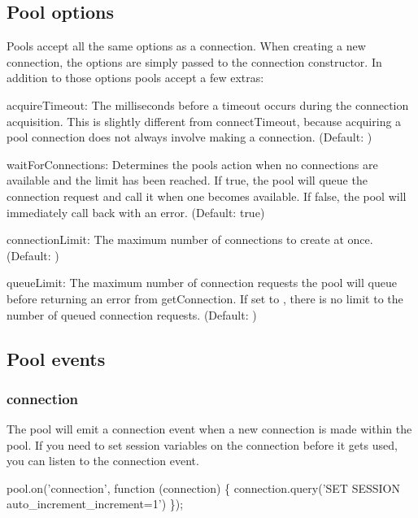\subsection*{Pool options}

Pools accept all the same options as a connection. When creating a new connection, the options are simply passed to the connection constructor. In addition to those options pools accept a few extras\+:


\begin{DoxyItemize}
\item {\ttfamily acquire\+Timeout}\+: The milliseconds before a timeout occurs during the connection acquisition. This is slightly different from {\ttfamily connect\+Timeout}, because acquiring a pool connection does not always involve making a connection. (Default\+: {})
\item {\ttfamily wait\+For\+Connections}\+: Determines the pool\textquotesingle{}s action when no connections are available and the limit has been reached. If {\ttfamily true}, the pool will queue the connection request and call it when one becomes available. If {\ttfamily false}, the pool will immediately call back with an error. (Default\+: {\ttfamily true})
\item {\ttfamily connection\+Limit}\+: The maximum number of connections to create at once. (Default\+: {})
\item {\ttfamily queue\+Limit}\+: The maximum number of connection requests the pool will queue before returning an error from {\ttfamily get\+Connection}. If set to {}, there is no limit to the number of queued connection requests. (Default\+: {})
\end{DoxyItemize}

\subsection*{Pool events}

\subsubsection*{connection}

The pool will emit a {\ttfamily connection} event when a new connection is made within the pool. If you need to set session variables on the connection before it gets used, you can listen to the {\ttfamily connection} event.


\begin{DoxyCode}
pool.on(\textcolor{stringliteral}{'connection'}, \textcolor{keyword}{function} (connection) \{
  connection.query(\textcolor{stringliteral}{'SET SESSION auto\_increment\_increment=1'})
\});
\end{DoxyCode}


